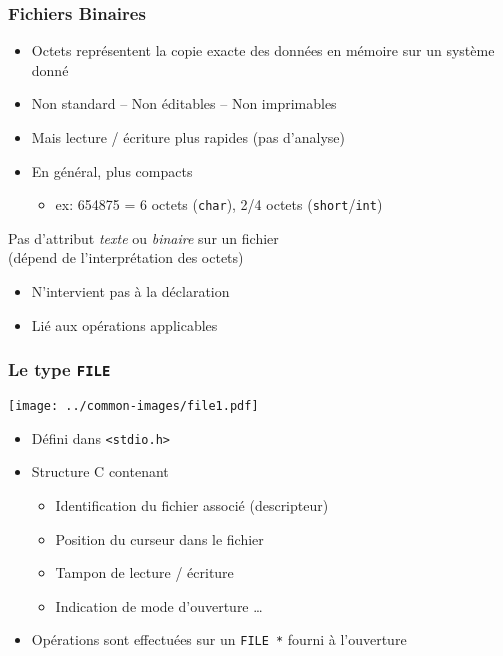 \documentclass[table,handout,tikz,12pt,svgnames]{beamer}
\begin{document}
\begin{frame}[fragile=singleslide]
	\frametitle{Fichiers Binaires}
	\vspace{-0.75cm}
		\begin{itemize}
			\item Octets représentent la copie exacte des données en mémoire sur un système donné
			\item Non standard -- Non éditables -- Non imprimables
			\item Mais lecture / écriture plus rapides (pas d'analyse)
			\item En général, plus compacts
			\begin{itemize}
				\item \small ex: 654875 = 6 octets (\texttt{char}), 2/4 octets (\texttt{short}/\texttt{int})
			\end{itemize}
		\end{itemize}
	\begin{block}{Pas d'attribut \textit{texte} ou \textit{binaire} sur un fichier \\(\small dépend de l'interprétation des octets)}
		\begin{itemize}
			\item N'intervient pas à la déclaration
			\item Lié aux opérations applicables
		\end{itemize}
	\end{block}
\end{frame}


\begin{frame}[fragile=singleslide]
	\frametitle{Le type \texttt{FILE}}
	\begin{block}{}
		{\texttt{[image: ../common-images/file1.pdf]}}		
		\begin{itemize}
			\item Défini dans \texttt{<stdio.h>}
			\item Structure C contenant
			\begin{itemize}
				\item Identification du fichier associé (descripteur)
				\item Position du curseur dans le fichier
				\item Tampon de lecture / écriture
				\item Indication de mode d'ouverture \ldots
			\end{itemize}
			\item Opérations sont effectuées sur un \texttt{FILE *} fourni à l'ouverture
		\end{itemize}
	\end{block}
\end{frame}
\end{document}
